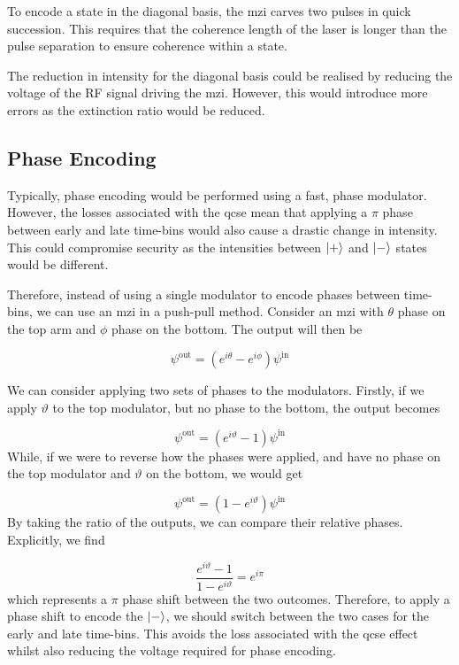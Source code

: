 To encode a state in the diagonal basis, the \ac{mzi} carves two pulses in quick succession. This requires that the coherence length of the laser is longer than the pulse separation to ensure coherence within a state. 

The reduction in intensity for the diagonal basis could be realised by reducing the voltage of the RF signal driving the \ac{mzi}. However, this would introduce more errors as the extinction ratio would be reduced.

\subsection{Phase Encoding}

Typically, phase encoding would be performed using a fast, phase modulator. However, the losses associated with the \ac{qcse} mean that applying a $\pi$ phase between early and late time-bins would also cause a drastic change in intensity. This could compromise security as the intensities between $\ket{+}$ and $\ket{-}$ states would be different. 

Therefore, instead of using a single modulator to encode phases between time-bins, we can use an \ac{mzi} in a push-pull method. Consider an \ac{mzi} with $\theta$ phase on the top arm and $\phi$ phase on the bottom. The output will then be 

\begin{equation}
	\psi^\mathrm{out} =  \left(e^{i\theta} - e^{i\phi}\right) \psi^\mathrm{in}
\end{equation}

We can consider applying two sets of phases to the modulators. Firstly, if we apply $\vartheta$ to the top modulator, but no phase to the bottom, the output becomes

\begin{equation}
	\psi^\mathrm{out} =  \left(e^{i\vartheta} -1\right) \psi^\mathrm{in}
\end{equation}
While, if we were to reverse how the phases were applied, and have no phase on the top modulator and $\vartheta$ on the bottom, we would get

\begin{equation}
	\psi^\mathrm{out} =  \left(1 - e^{i\vartheta}\right) \psi^\mathrm{in}
\end{equation}
By taking the ratio of the outputs, we can compare their relative phases. Explicitly, we find

\begin{equation}
	\frac{e^{i\vartheta} -1}{1 - e^{i\vartheta}} = e^{i\pi}
\end{equation}
which represents a $\pi$ phase shift between the two outcomes. Therefore, to apply a phase shift to encode the $\ket{-}$, we should switch between the two cases for the early and late time-bins. This avoids the loss associated with the \ac{qcse} effect whilst also reducing the voltage required for phase encoding.

